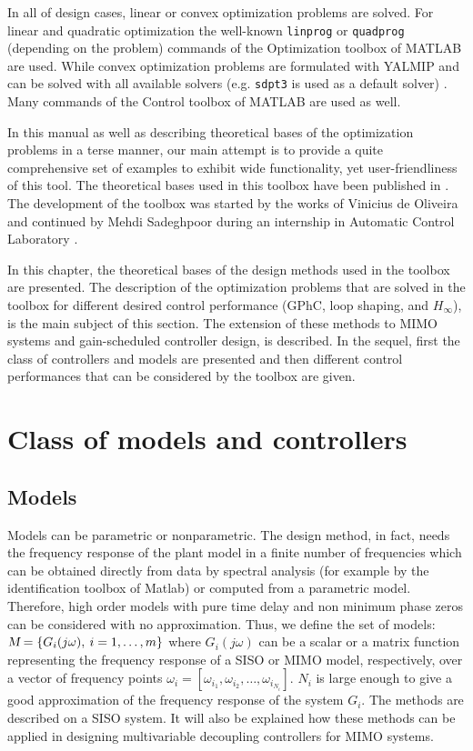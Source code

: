\documentclass [12pt , a4paper] {report}
\begin{document}
In all of design cases, linear or convex optimization problems are solved. For linear and quadratic optimization the well-known \texttt{linprog} or \texttt{quadprog} (depending on the problem) commands of the Optimization toolbox of MATLAB are used. While convex optimization problems are formulated with YALMIP and can be solved with all available solvers (e.g. \texttt{sdpt3} is used as a default solver) . Many commands of the Control toolbox of MATLAB are used as well.

In this manual as well as describing theoretical bases of the optimization problems in a terse manner, our main attempt is to provide a quite comprehensive set of examples to exhibit wide functionality, yet user-friendliness of this tool.  The theoretical bases used in this toolbox have been published in  \cite{KKL07, KKL07e,KG10,GKL10b}. The development of the toolbox was started by the works of Vinicius de Oliveira and continued by Mehdi Sadeghpoor during an internship in Automatic Control Laboratory \cite{SOK12}.

In this chapter, the theoretical bases of the design methods used in the toolbox are presented. The description of the optimization problems that are solved in the toolbox for different desired control performance  (GPhC, loop shaping, and $H_{\infty}$), is the main subject of this section. The extension of these methods to MIMO systems and gain-scheduled controller design, is described. In the sequel, first the class of controllers and models are presented and then different control performances that can be considered by the toolbox are given.

\section{Class of models and controllers}

\subsection{Models}

Models can be parametric or nonparametric. The design method, in fact, needs the frequency response of the plant model in a finite number of frequencies which can be obtained directly from data by spectral analysis (for example by the identification toolbox of Matlab) or computed from a parametric model. Therefore, high order models with pure time delay and non minimum phase zeros can be considered with no approximation. Thus, we define the set of models:  $\textsl{M}=\{G_i(j\omega), \: i=1,\ldots,m \}$ where $G_i(j\omega)$ can be a scalar or a matrix function representing the frequency response of a SISO or MIMO model, respectively, over a vector of frequency points $\omega_i=[\omega_{i_1}, \omega_{i_2}, \ldots, \omega_{i_{N_i}}]$. $N_i$ is large enough to give a good approximation of the frequency response of the system $G_i$. The methods are described on a SISO system. It will also be explained how these methods can be applied in designing multivariable decoupling controllers for MIMO systems.  
\end{document}

